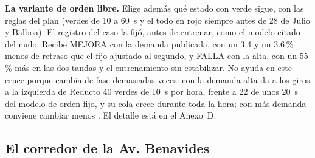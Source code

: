 \noindent\textbf{La variante de orden libre.} Elige además qué estado
con verde sigue, con las reglas del plan (verdes de 10 a 60~s y el todo
en rojo siempre antes de 28 de Julio y Balboa). El
registro del caso la fijó, antes de entrenar, como el modelo citado del
nudo. Recibe MEJORA con la demanda publicada, con un 3.4 y un 3.6\,\%
menos de retraso que el fijo ajustado al segundo, y FALLA con la alta,
con un 55\,\% más en las dos tandas y el entrenamiento sin estabilizar.
No ayuda en este cruce porque cambia de fase demasiadas veces: con la
demanda alta da a los giros a la izquierda de Reducto 40 verdes de 10~s
por hora, frente a 22 de unos 20~s del modelo de orden fijo, y su cola
crece durante toda la hora; con más demanda conviene cambiar menos
\citep{Wang2022_SwitchingLoss}. El detalle está en el Anexo~D.


\subsection{El corredor de la Av. Benavides}
\label{sec:lima-corredor}


